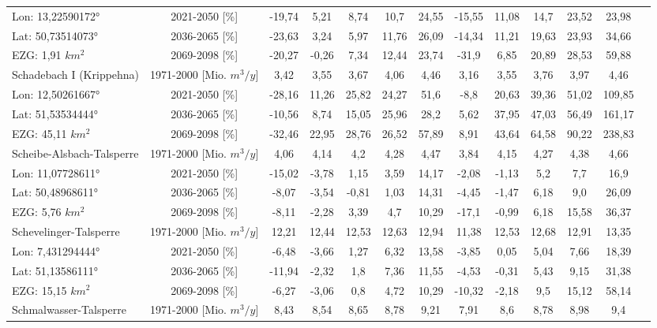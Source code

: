 \begin{longtable}{@{\extracolsep{\fill}}lc|ccccc||cccccc}
\cline{2-13} 
Lon: 13,22590172° & 2021-2050 [\%]  & -19,74 & 5,21 & 8,74 & 10,7 & 24,55 & -15,55 & 11,08 & 14,7 & 23,52 & 23,98 & \\ 
Lat: 50,73514073° & 2036-2065 [\%]  & -23,63 & 3,24 & 5,97 & 11,76 & 26,09 & -14,34 & 11,21 & 19,63 & 23,93 & 34,66 & \\ 
EZG: 1,91 $km^2$ & 2069-2098 [\%]  & -20,27 & -0,26 & 7,34 & 12,44 & 23,74 & -31,9 & 6,85 & 20,89 & 28,53 & 59,88 & \\ 
\hline 
Schadebach I (Krippehna) & 1971-2000 [Mio. $m^3/y$]  & 3,42 & 3,55 & 3,67 & 4,06 & 4,46 & 3,16 & 3,55 & 3,76 & 3,97 & 4,46 & \\ 
\cline{2-13} 
Lon: 12,50261667° & 2021-2050 [\%]  & -28,16 & 11,26 & 25,82 & 24,27 & 51,6 & -8,8 & 20,63 & 39,36 & 51,02 & 109,85 & \\ 
Lat: 51,53534444° & 2036-2065 [\%]  & -10,56 & 8,74 & 15,05 & 25,96 & 28,2 & 5,62 & 37,95 & 47,03 & 56,49 & 161,17 & \\ 
EZG: 45,11 $km^2$ & 2069-2098 [\%]  & -32,46 & 22,95 & 28,76 & 26,52 & 57,89 & 8,91 & 43,64 & 64,58 & 90,22 & 238,83 & \\ 
\hline 
Scheibe-Alsbach-Talsperre & 1971-2000 [Mio. $m^3/y$]  & 4,06 & 4,14 & 4,2 & 4,28 & 4,47 & 3,84 & 4,15 & 4,27 & 4,38 & 4,66 & \\ 
\cline{2-13} 
Lon: 11,07728611° & 2021-2050 [\%]  & -15,02 & -3,78 & 1,15 & 3,59 & 14,17 & -2,08 & -1,13 & 5,2 & 7,7 & 16,9 & \\ 
Lat: 50,48968611° & 2036-2065 [\%]  & -8,07 & -3,54 & -0,81 & 1,03 & 14,31 & -4,45 & -1,47 & 6,18 & 9,0 & 26,09 & \\ 
EZG: 5,76 $km^2$ & 2069-2098 [\%]  & -8,11 & -2,28 & 3,39 & 4,7 & 10,29 & -17,1 & -0,99 & 6,18 & 15,58 & 36,37 & \\ 
\hline 
Schevelinger-Talsperre & 1971-2000 [Mio. $m^3/y$]  & 12,21 & 12,44 & 12,53 & 12,63 & 12,94 & 11,38 & 12,53 & 12,68 & 12,91 & 13,35 & \\ 
\cline{2-13} 
Lon: 7,431294444° & 2021-2050 [\%]  & -6,48 & -3,66 & 1,27 & 6,32 & 13,58 & -3,85 & 0,05 & 5,04 & 7,66 & 18,39 & \\ 
Lat: 51,13586111° & 2036-2065 [\%]  & -11,94 & -2,32 & 1,8 & 7,36 & 11,55 & -4,53 & -0,31 & 5,43 & 9,15 & 31,38 & \\ 
EZG: 15,15 $km^2$ & 2069-2098 [\%]  & -6,27 & -3,06 & 0,8 & 4,72 & 10,29 & -10,32 & -2,18 & 9,5 & 15,12 & 58,14 & \\ 
\hline 
Schmalwasser-Talsperre & 1971-2000 [Mio. $m^3/y$]  & 8,43 & 8,54 & 8,65 & 8,78 & 9,21 & 7,91 & 8,6 & 8,78 & 8,98 & 9,4 & \\ 

\end{longtable}
